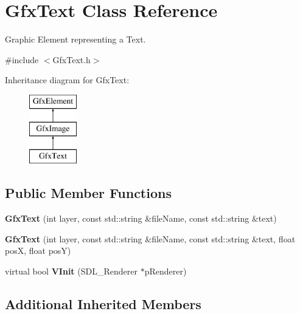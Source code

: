 \hypertarget{classGfxText}{\section{Gfx\-Text Class Reference}
\label{classGfxText}
}


Graphic Element representing a Text.  




{\ttfamily \#include $<$Gfx\-Text.\-h$>$}

Inheritance diagram for Gfx\-Text\-:\begin{figure}[H]
\begin{center}
\leavevmode
\includegraphics[height=3.000000cm]{classGfxText}
\end{center}
\end{figure}
\subsection*{Public Member Functions}
\begin{DoxyCompactItemize}
\item 
\hypertarget{classGfxText_a1c86bba60b73fbc1a969728a97962c32}{{\bfseries Gfx\-Text} (int layer, const std\-::string \&file\-Name, const std\-::string \&text)}\label{classGfxText_a1c86bba60b73fbc1a969728a97962c32}

\item 
\hypertarget{classGfxText_aabbfc3a2ae090b3c313dd61f7b20b345}{{\bfseries Gfx\-Text} (int layer, const std\-::string \&file\-Name, const std\-::string \&text, float pos\-X, float pos\-Y)}\label{classGfxText_aabbfc3a2ae090b3c313dd61f7b20b345}

\item 
\hypertarget{classGfxText_aa1db6f99cb1e51d3f89948147c2a061e}{virtual bool {\bfseries V\-Init} (S\-D\-L\-\_\-\-Renderer $\ast$p\-Renderer)}\label{classGfxText_aa1db6f99cb1e51d3f89948147c2a061e}

\end{DoxyCompactItemize}
\subsection*{Additional Inherited Members}


